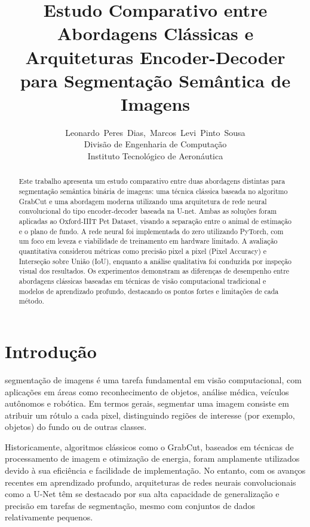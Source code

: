 \documentclass[journal]{IEEEtran}
\begin{document}
\title{Estudo Comparativo entre Abordagens Clássicas e Arquiteturas Encoder-Decoder para Segmentação Semântica de Imagens}
\author{Leonardo~Peres~Dias,~Marcos~Levi~Pinto~Sousa \\ Divisão de Engenharia de Computação\\ Instituto Tecnológico de Aeronáutica 
}

%
{}

\maketitle

\begin{abstract}
Este trabalho apresenta um estudo comparativo entre duas abordagens distintas para segmentação semântica binária de imagens: uma técnica clássica baseada no algoritmo GrabCut e uma abordagem moderna utilizando uma arquitetura de rede neural convolucional do tipo encoder-decoder baseada na U-net. Ambas as soluções foram aplicadas ao Oxford-IIIT Pet Dataset, visando a separação entre o animal de estimação e o plano de fundo. A rede neural foi implementada do zero utilizando PyTorch, com um foco em leveza e viabilidade de treinamento em hardware limitado. A avaliação quantitativa considerou métricas como precisão pixel a pixel (Pixel Accuracy) e Interseção sobre União (IoU), enquanto a análise qualitativa foi conduzida por inspeção visual dos resultados. Os experimentos demonstram as diferenças de desempenho entre abordagens clássicas baseadas em técnicas de visão computacional tradicional e modelos de aprendizado profundo, destacando os pontos fortes e limitações de cada método.
\end{abstract}

\IEEEpeerreviewmaketitle

\section{Introdução}

 segmentação de imagens é uma tarefa fundamental em visão computacional, com aplicações em áreas como reconhecimento de objetos, análise médica, veículos autônomos e robótica. Em termos gerais, segmentar uma imagem consiste em atribuir um rótulo a cada pixel, distinguindo regiões de interesse (por exemplo, objetos) do fundo ou de outras classes.

Historicamente, algoritmos clássicos como o GrabCut, baseados em técnicas de processamento de imagem e otimização de energia, foram amplamente utilizados devido à sua eficiência e facilidade de implementação. No entanto, com os avanços recentes em aprendizado profundo, arquiteturas de redes neurais convolucionais como a U-Net têm se destacado por sua alta capacidade de generalização e precisão em tarefas de segmentação, mesmo com conjuntos de dados relativamente pequenos.
\end{document}
